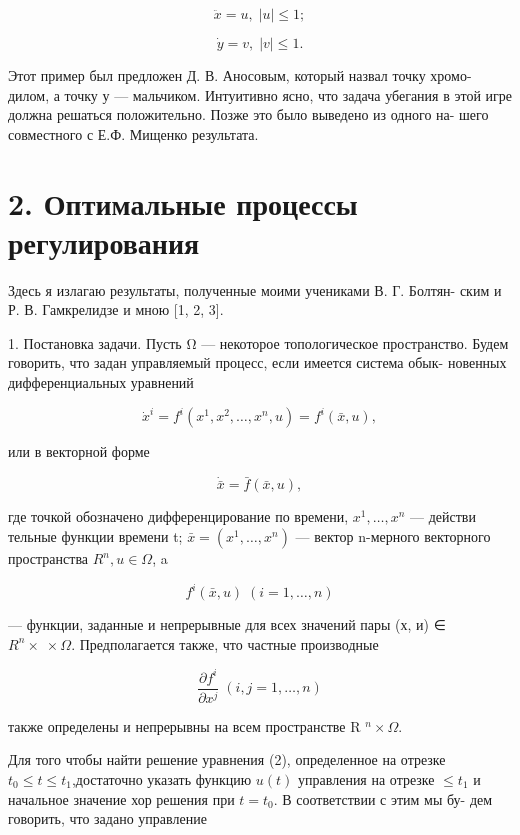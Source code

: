 \documentclass[10pt]{article}
\begin{document}
\[
\ddot{x} = u,\;\left| u\right|  \leq  1;
\]

\[
\dot{y} = v,\;\left| v\right|  \leq  1.
\]

Этот пример был предложен Д. В. Аносовым, который назвал точку хромо- дилом, а точку у — мальчиком. Интуитивно ясно, что задача убегания в этой игре должна решаться положительно. Позже это было выведено из одного на- шего совместного с Е.Ф. Мищенко результата.

\section*{2. Оптимальные процессы регулирования}

Здесь я излагаю результаты, полученные моими учениками В. Г. Болтян- ским и Р. В. Гамкрелидзе и мною [1, 2, 3].

1. Постановка задачи. Пусть Ω — некоторое топологическое пространство. Будем говорить, что задан управляемый процесс, если имеется система обык- новенных дифференциальных уравнений

\[
{\dot{x}}^{i} = {f}^{i}\left( {{x}^{1},{x}^{2},\ldots,{x}^{n},u}\right)  = {f}^{i}\left( {\bar{x},u}\right), \tag{1}
\]

или в векторной форме

\[
\dot{\bar{x}} = \bar{f}\left( {\bar{x},u}\right), \tag{2}
\]

где точкой обозначено дифференцирование по времени, \({x}^{1},\ldots,{x}^{n}\) — действи тельные функции времени t; \(\bar{x} = \left( {{x}^{1},\ldots,{x}^{n}}\right)\) — вектор n-мерного векторного пространства \({R}^{n},u \in  \Omega\), a

\[
{f}^{i}\left( {\bar{x},u}\right) \;\left( {i = 1,\ldots,n}\right)
\]

— функции, заданные и непрерывные для всех значений пары (х, и) ∈ \({R}^{n} \times \; \times  \Omega\). Предполагается также, что частные производные

\[
\frac{\partial {f}^{i}}{\partial {x}^{j}}\;\left( {i,j = 1,\ldots,n}\right)
\]

также определены и непрерывны на всем пространстве R \({}^{n} \times  \Omega\).

Для того чтобы найти решение уравнения (2), определенное на отрезке \({t}_{0} \leq  t \leq  {t}_{1}\),достаточно указать функцию \(u\left( t\right)\) управления на отрезке \(\leq  {t}_{1}\) и начальное значение хор решения при \(t = {t}_{0}\). В соответствии с этим мы бу- дем говорить, что задано управление
\end{document}
